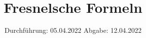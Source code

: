 

\subject{V407}
\title{Fresnelsche Formeln}
\date{%
  Durchführung: 05.04.2022
  \hspace{3em}
  Abgabe: 12.04.2022
}



\maketitle
\thispagestyle{empty}
\tableofcontents
\newpage



\newpage


\newpage


\printbibliography{}


